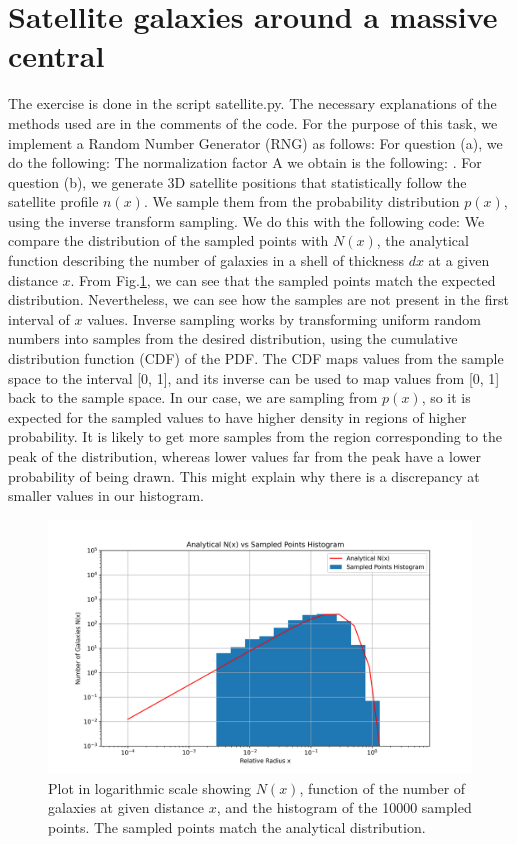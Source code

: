 \section{Satellite galaxies around a massive central}
The exercise is done in the script satellite.py. The necessary explanations of the methods used are in the comments of the code. For the purpose of this task, we implement a Random Number Generator (RNG) as follows: 
For question (a), we do the following:  The normalization factor A we obtain is the following: .
For question (b), we generate 3D satellite positions that statistically follow the satellite profile $n(x)$. We sample them from the probability distribution $p(x)$, using the inverse transform sampling. We do this with the following code: 
We compare the distribution of the sampled points with $N(x)$, the analytical function describing the number of galaxies in a shell of thickness $dx$ at a given distance $x$. From Fig.\ref{fig:n_vs_hist}, we can see that the sampled points match the expected distribution. Nevertheless, we can see how the samples are not present in the first interval of $x$ values. Inverse sampling works by transforming uniform random numbers into samples from the desired distribution, using the cumulative distribution function (CDF) of the PDF. The CDF maps values from the sample space to the interval [0, 1], and its inverse can be used to map values from [0, 1] back to the sample space. In our case, we are sampling from $p(x)$, so it is expected for the sampled values to have higher density in regions of higher probability. It is likely to get more samples from the region corresponding to the peak of the distribution, whereas lower values far from the peak have a lower probability of being drawn.
This might explain why there is a discrepancy at smaller values in our histogram.

\begin{figure}[h!]
  \centering
  \includegraphics[width=0.9\linewidth]{./plots/my_solution_1b.png}
  \caption{Plot in logarithmic scale showing $N(x)$, function of the number of galaxies at given distance $x$, and the histogram of the 10000 sampled points. The sampled points match the analytical distribution.}
  \label{fig:n_vs_hist}
\end{figure}

